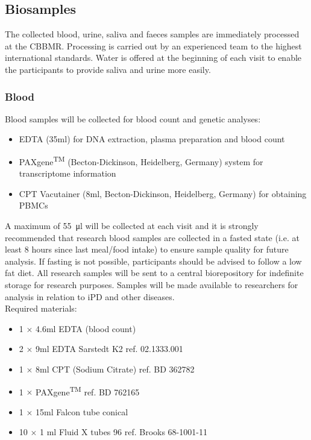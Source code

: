 \QPsychometrics{}

\subsection{Biosamples}
\label{subsec:biosamples}
The collected blood, urine, saliva and faeces samples are immediately processed at the \ac{CBBMR}. Processing is carried out by an experienced team to the highest international standards. Water is offered at the beginning of each visit to enable the participants to provide saliva and urine more easily.

\subsubsection{Blood}
\label{biosamples:blood}
Blood samples will be collected for blood count and genetic analyses:
\begin{itemize}
\item \acs{EDTA} (35ml) for \acs{DNA} extraction, plasma preparation and blood count
\item PAXgene\textsuperscript{TM} (Becton-Dickinson, Heidelberg, Germany) system
      for transcriptome information
\item \acs{CPT} Vacutainer (8ml, Becton-Dickinson, Heidelberg, Germany)
      for obtaining \acsp{PBMC}
\end{itemize}
A maximum of \SI[round-precision = 0, round-mode = places]{55}{\micro\litre} will be collected at each visit and it is strongly recommended that research blood samples are collected in a fasted state (i.e. at least 8 hours since last meal/food intake) to ensure sample quality for future analysis. If fasting is not possible, participants should be advised to follow a low fat diet. All research samples will be sent to a central biorepository for indefinite storage for research purposes. Samples will be made available to researchers for analysis in relation to \ac{iPD} and other diseases. \\

\noindent Required materials:
\begin{itemize}
  \item 1 $\times$ 4.6ml \acs{EDTA} (blood count)
  \item 2 $\times$ 9ml \acs{EDTA} Sarstedt K2 ref. 02.1333.001 
  \item 1 $\times$ 8ml \acs{CPT} (Sodium Citrate) ref. BD 362782
  \item 1 $\times$ PAXgene\textsuperscript{TM} ref. BD 762165
  \item 1 $\times$ 15ml Falcon tube conical 
  \item 10 $\times$ 1 ml Fluid X tubes 96 ref. Brooks 68-1001-11 
\end{itemize}


